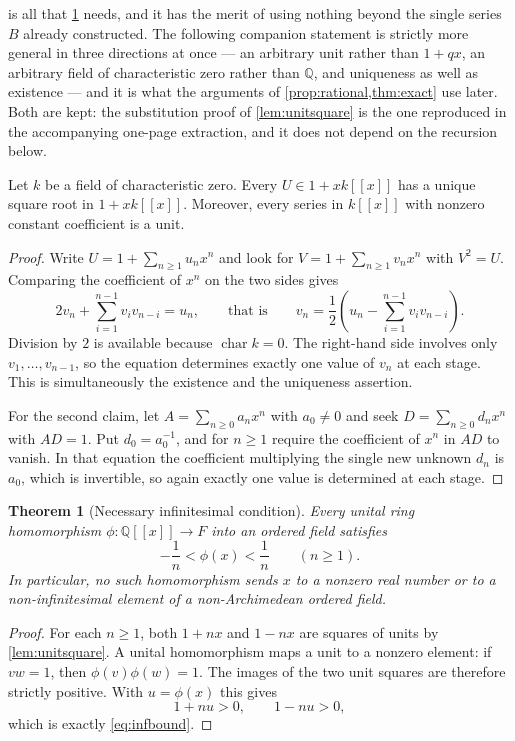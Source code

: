 \documentclass[11pt,letterpaper]{article}
\newtheorem{theorem}{Theorem}[section]
\theoremstyle{definition}
\theoremstyle{remark}
\newenvironment{lemma}{\crefalias{theorem}{lemma}\lemmax}{\endlemmax}
\newcommand{\Q}{\mathbb Q}
\begin{document}
 is all that \cref{thm:necessary} needs, and it has the
merit of using nothing beyond the single series $B$ already constructed. The
following companion statement is strictly more general in three directions at
once --- an arbitrary unit rather than $1+qx$, an arbitrary field of
characteristic zero rather than $\Q$, and uniqueness as well as existence ---
and it is what the arguments of \cref{prop:rational,thm:exact} use later.
Both are kept: the substitution proof of \cref{lem:unitsquare} is the one
reproduced in the accompanying one-page extraction, and it does not depend on
the recursion below.

\begin{lemma}[Square roots of units, general form]\label{lem:unit-root}
Let $k$ be a field of characteristic zero. Every $U\in1+xk[[x]]$ has a unique
square root in $1+xk[[x]]$. Moreover, every series in $k[[x]]$ with nonzero
constant coefficient is a unit.
\end{lemma}
\begin{proof}
Write $U=1+\sum_{n\ge1}u_nx^n$ and look for $V=1+\sum_{n\ge1}v_nx^n$ with
$V^2=U$. Comparing the coefficient of $x^n$ on the two sides gives
\[
 2v_n+\sum_{i=1}^{n-1}v_iv_{n-i}=u_n,
 \qquad\text{that is}\qquad
 v_n=\frac12\left(u_n-\sum_{i=1}^{n-1}v_iv_{n-i}\right).
\]
Division by $2$ is available because $\operatorname{char}k=0$. The
right-hand side involves only $v_1,\ldots,v_{n-1}$, so the equation determines
exactly one value of $v_n$ at each stage. This is simultaneously the existence
and the uniqueness assertion.

For the second claim, let $A=\sum_{n\ge0}a_nx^n$ with $a_0\ne0$ and seek
$D=\sum_{n\ge0}d_nx^n$ with $AD=1$. Put $d_0=a_0^{-1}$, and for $n\ge1$
require the coefficient of $x^n$ in $AD$ to vanish. In that equation the
coefficient multiplying the single new unknown $d_n$ is $a_0$, which is
invertible, so again exactly one value is determined at each stage.
\end{proof}

\begin{theorem}[Necessary infinitesimal condition]\label{thm:necessary}
Every unital ring homomorphism $\phi:\Q[[x]]\to F$ into an ordered field
satisfies
\begin{equation}\label{eq:infbound}
 -\frac1n<\phi(x)<\frac1n\qquad(n\ge1).
\end{equation}
In particular, no such homomorphism sends $x$ to a nonzero real number or
to a non-infinitesimal element of a non-Archimedean ordered field.
\end{theorem}
\begin{proof}
For each $n\ge1$, both $1+nx$ and $1-nx$ are squares of units by
\cref{lem:unitsquare}. A unital homomorphism maps a unit to a nonzero element:
if $vw=1$, then $\phi(v)\phi(w)=1$. The images of the two unit squares are
therefore strictly positive. With $u=\phi(x)$ this gives
\[
 1+nu>0,\qquad 1-nu>0,
\]
which is exactly \eqref{eq:infbound}.
\end{proof}
\end{document}
